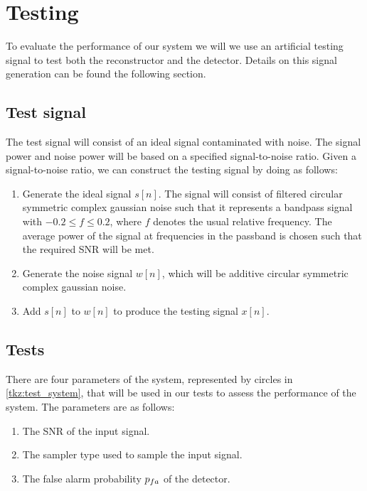 \documentclass[a4paper, openany, oneside]{memoir}
\begin{document}
\section{Testing}
To evaluate the performance of our system we will we use an artificial testing signal to test both the reconstructor and the detector.
Details on this signal generation can be found the following section.

\subsection{Test signal}\label{ssec:test_signal}
The test signal will consist of an ideal signal contaminated with noise. The signal power and noise power will be based on a specified signal-to-noise ratio. Given a signal-to-noise ratio, we can construct the testing signal by doing as follows:

\begin{enumerate}
	\item Generate the ideal signal $s[n]$. The signal will consist of filtered circular symmetric complex gaussian noise such that it represents a bandpass signal with $-0.2 \leq f\leq 0.2$, where $f$ denotes the usual relative frequency. The average power of the signal at frequencies in the passband is chosen such that the required SNR will be met. 
	\item Generate the noise signal $w[n]$, which will be additive circular symmetric complex gaussian noise.
	\item Add $s[n]$ to $w[n]$ to produce the testing signal $x[n]$.
\end{enumerate}

\subsection{Tests}
There are four parameters of the system, represented by circles in \cref{tkz:test_system}, that will be used in our tests to assess the performance of the system. The parameters are as follows:
\begin{enumerate}
	\item The SNR of the input signal.
	\item The sampler type used to sample the input signal.
	\item The false alarm probability $p\ss{fa}$ of the detector.
\end{enumerate}
\end{document}
